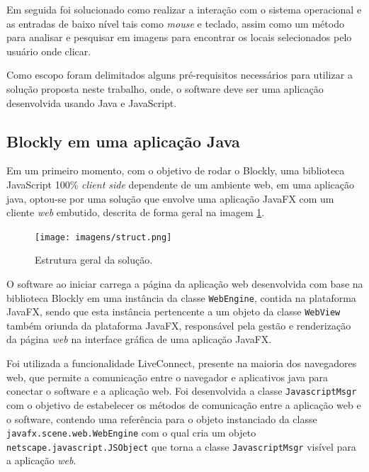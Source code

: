 \documentclass[tg]{mdtufsm}
\begin{document}
                Em seguida foi solucionado como realizar a interação com o sistema operacional e as entradas de baixo nível tais como \emph{mouse} e teclado, assim como um método para analisar e pesquisar em imagens para encontrar os locais selecionados pelo usuário onde clicar.

                Como escopo foram delimitados alguns pré-requisitos necessários para utilizar a solução proposta neste trabalho, onde, o software deve ser uma aplicação desenvolvida usando Java e JavaScript.

                \subsection {Blockly em uma aplicação Java}

                Em um primeiro momento, com o objetivo de rodar o Blockly, uma biblioteca JavaScript 100\% \emph{client side} dependente de um ambiente web, em uma aplicação java, optou-se por uma solução que envolve uma aplicação JavaFX com um cliente \emph{web} embutido, descrita de forma geral na imagem \ref{fig:struct}.

                \begin{figure}[!htb]
                    {\centering
                    \texttt{[image: imagens/struct.png]}
                    \caption{Estrutura geral da solução.}
                    \label{fig:struct}}
                \end{figure}

                O software ao iniciar carrega a página da aplicação web desenvolvida com base na biblioteca Blockly em uma instância da classe \texttt{WebEngine}, contida na plataforma JavaFX, sendo que esta instância pertencente a um objeto da classe \texttt{WebView} também oriunda da plataforma JavaFX, responsável pela gestão e renderização da página \emph{web} na interface gráfica de uma aplicação JavaFX.

                Foi utilizada a funcionalidade LiveConnect, presente na maioria dos navegadores web, que permite a comunicação entre o navegador e aplicativos java para conectar o software e a aplicação web. Foi desenvolvida a classe \texttt{JavascriptMsgr} com o objetivo de estabelecer os métodos de comunicação entre a aplicação web e o software, contendo uma referência para o objeto instanciado da classe \texttt{javafx.scene.web.WebEngine} com o qual cria um objeto \texttt{netscape.javascript.JSObject} que torna a classe \texttt{JavascriptMsgr} visível para a aplicação \emph{web}.
\end{document}
